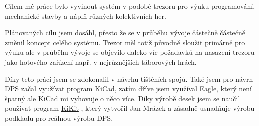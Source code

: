 Cílem mé práce bylo vyvinout systém v podobě trezoru pro výuku programování, mechanické stavby a náplň různých kolektivních her. 

Plánovaných cílu jsem dosáhl, přesto že se v průběhu vývoje částečně částečně změnil koncept celého systému. Trezor měl totiž původně sloužit primárně pro výuku ale v průběhu vývoje 
se objevilo daleko víc požadavků na nasazení trezoru jako hotového zařízení např. v nejrůznějších táborových hrách. %

Díky teto práci jsem se zdokonalil v návrhu tištěních spojů. Také jsem pro návrh DPS začal využívat program KiCad, zatím dříve jsem využíval Eagle, který není špatný ale KiCad 
mi vyhovuje o něco více. Díky výrobě desek jsem se naučil používat program \href{https://github.com/yaqwsx/KiKit}{KiKit} \parencite{KiKit}, 
který vytvořil Jan Mrázek a zásadně usnadňuje výrobu podkladu pro reálnou výrobu DPS.


